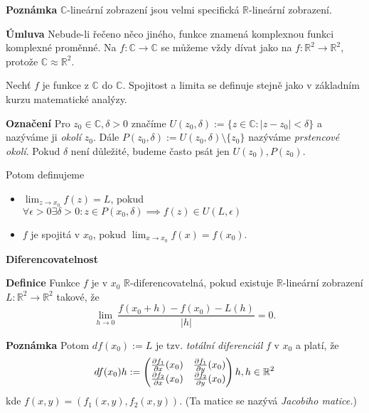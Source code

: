\documentclass[11pt, a4paper, onecolumn]{article}
\begin{document}
\textbf{Poznámka} $\mathbb{C}$-lineární zobrazení jsou velmi specifická $\mathbb{R}$-lineární zobrazení.


\textbf{Úmluva} Nebude-li řečeno něco jiného, funkce znamená komplexnou funkci komplexné proměnné. Na $f: \mathbb{C} \to \mathbb{C}$ se můžeme vždy dívat jako na $f: \mathbb{R}^2 \to \mathbb{R}^2$, protože $\mathbb{C}\approx\mathbb{R}^2$.

Nechť $f$ je funkce z $\mathbb{C}$ do $\mathbb{C}$. Spojitost a limita se definuje stejně jako v základním kurzu matematické analýzy.

\textbf{Označení} Pro $z_0\in\mathbb{C}, \delta>0$ značíme $U(z_0,\delta):= \{z\in\mathbb{C}: |z-z_0|<\delta\}$ a nazýváme ji \textit{okolí} $z_0$. Dále $P(z_0,\delta):= U(z_0,\delta)\setminus\{z_0\}$ nazýváme \textit{prstencové okolí}. Pokud $\delta$ není důležité, budeme často psát jen $U(z_0), P(z_0)$.

Potom definujeme
\begin{itemize}
    \item $\lim_{z\to x_0} {f(z)} = L$, pokud $\forall\epsilon>0\exists\delta>0:z\in P(x_0,\delta)\implies f(z)\in U(L, \epsilon)$
    \item $f$ je spojitá v $x_0$, pokud $\lim_{x\to x_0}{f(x)} = f(x_0)$.
\end{itemize}


\textbf{\Large{Diferencovatelnost}}
\newline

\textbf{Definice} Funkce $f$ je v $x_0$ $\mathbb{R}$-diferencovatelná, pokud existuje $\mathbb{R}$-lineární zobrazení \\$L: \mathbb{R}^2\to\mathbb{R}^2$ takové, že 
$$\lim_{h\to 0}\frac{f(x_0+h)-f(x_0)-L(h)}{|h|} = 0.$$

\textbf{Poznámka} Potom $df(x_0):=L$ je tzv. \textit{totální diferenciál} $f$ v $x_0$ a platí, že $$df(x_0)h:=\begin{pmatrix}
\frac{\partial f_1}{\partial x}(x_0) & \frac{\partial f_1}{\partial y}(x_0)\\
\frac{\partial f_2}{\partial x}(x_0) & \frac{\partial f_2}{\partial y}(x_0)
\end{pmatrix}h,\vspace{5mm} h\in \mathbb{R}^2$$
kde $f(x,y) = (f_1(x,y),f_2(x,y)).$ (Ta matice se nazývá \textit{Jacobiho matice.})

\end{document}
